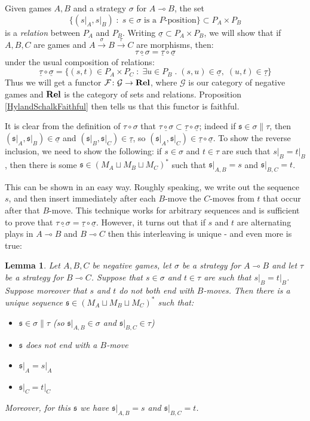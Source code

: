 \documentclass[11pt]{article} %
\theoremstyle{plain} %
\newtheorem{lemma}[theorem]{Lemma}
\theoremstyle{definition} %
\theoremstyle{exercisestyle}
\newcommand{\catname}[1]{{\normalfont\textbf{#1}}}
\newcommand{\Rel}{\catname{Rel}}
\newcommand{\map}[3]{#2\xrightarrow{#1} #3}
\newcommand*\from{\colon}
\newcommand{\cmap}[3]{#1\from{}#2\to{}#3}
\renewcommand{\implies}{\multimap}
\newcommand{\comp}[2]{#1 \circ #2}
\newcommand{\cprd}{\sqcup}
\newcommand{\G}{\mathcal G}
\newcommand{\suchthat}{\;\colon\;}
\newcommand{\esuchthat}{\;.\;}
\newcommand{\F}{\mathcal F}
\newcommand{\s}{\mathfrak s}
\newcommand{\grel}[1]{\underline{#1}}
\begin{document}
Given games $A,B$ and a strategy $\sigma$ for $A\implies B$, the set
\[
  \{(s\vert_A,s\vert_B)\suchthat \textrm{$s\in\sigma$ is a $P$-position}\}\subset P_A\times P_B
  \]
is a \emph{relation} between $P_A$ and $P_B$.  Writing $\grel\sigma\subset P_A\times P_B$, we will show that if $A,B,C$ are games and $A\xrightarrow{\sigma}\map{\tau}{B}{C}$ are morphisms, then:
\[
  \grel{\comp\tau\sigma}=\comp{\grel\tau}{\grel\sigma}
  \]
under the usual composition of relations:
\[
  \comp{\grel\tau}{\grel\sigma} = \{(s,t)\in P_A\times P_C\suchthat \exists u\in P_B\esuchthat (s,u)\in\grel\sigma,\;(u,t)\in\grel\tau\}
  \]
Thus we will get a functor $\cmap{\F}{\G}{\Rel}$, where $\G$ is our category of negative games and $\Rel$ is the category of sets and relations.  Proposition \ref{HylandSchalkFaithful} then tells us that this functor is faithful.  

It is clear from the definition of $\comp\tau\sigma$ that $\grel{\comp\tau\sigma}\subset\comp{\grel\tau}{\grel\sigma}$; indeed if $\s\in\sigma\|\tau$, then $(\s\vert_A,\s\vert_B)\in\grel\sigma$ and $(\s\vert_B,\s\vert_C)\in\grel\tau$, so $(\s\vert_A,\s\vert_C)\in\comp{\grel\tau}{\grel\sigma}$.  To show the reverse inclusion, we need to show the following: if $s\in\sigma$ and $t\in\tau$ are such that $s\vert_B=t\vert_B$, then there is some $\s\in (M_A\cprd M_B\cprd M_C)^*$ such that $\s\vert_{A,B}=s$ and $\s\vert_{B,C}=t$.  

This can be shown in an easy way.  Roughly speaking, we write out the sequence $s$, and then insert immediately after each $B$-move the $C$-moves from $t$ that occur after that $B$-move.  This technique works for arbitrary sequences and is sufficient to prove that $\grel{\comp\tau\sigma}=\comp{\grel\tau}{\grel\sigma}$.  However, it turns out that if $s$ and $t$ are alternating plays in $A\implies B$ and $B\implies C$ then this interleaving is unique - and even more is true:

\begin{lemma}
  \label{LiftingLemma}
  Let $A,B,C$ be negative games, let $\sigma$ be a strategy for $A\implies B$ and let $\tau$ be a strategy for $B\implies C$.  Suppose that $s\in\sigma$ and $t\in\tau$ are such that $s\vert_B=t\vert_B$.  Suppose moreover that $s$ and $t$ do not both end with $B$-moves.  Then there is a unique sequence $\s\in(M_A\cprd M_B\cprd M_C)^*$ such that:
  \begin{itemize}
    \item $\s\in\sigma\|\tau$ (so $\s\vert_{A,B}\in\sigma$ and $\s\vert_{B,C}\in\tau$)
    \item $\s$ does not end with a $B$-move
    \item $\s\vert_A=s\vert_A$
    \item $\s\vert_C=t\vert_C$
  \end{itemize}
  Moreover, for this $\s$ we have $\s\vert_{A,B}=s$ and $\s\vert_{B,C}=t$.
\end{lemma}
\end{document}
